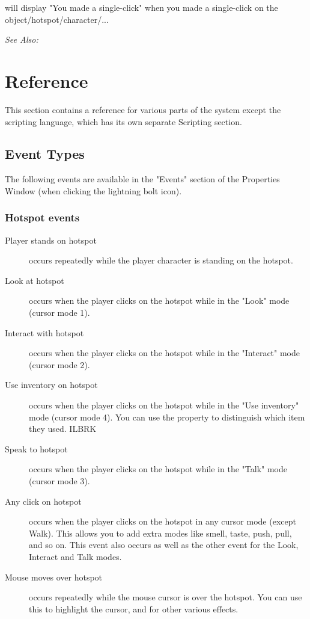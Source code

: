will display "You made a single-click" when you made a single-click on the object/hotspot/character/...

\it{See Also:} 




\chapter{Reference}%

This section contains a reference for various parts of the system except the scripting
language, which has its own separate Scripting section.

\section{Event Types}%

The following events are available in the "Events" section of the Properties Window
(when clicking the lightning bolt icon).

\subsection{Hotspot events}%

\begin{description}
\item [Player stands on hotspot] occurs repeatedly while the player character
is standing on the hotspot.
\item [Look at hotspot] occurs when the player clicks on the hotspot while in
the "Look" mode (cursor mode 1).
\item [Interact with hotspot] occurs when the player clicks on the hotspot while
in the "Interact" mode (cursor mode 2).
\item [Use inventory on hotspot] occurs when the player clicks on the hotspot
while in the "Use inventory" mode (cursor mode 4). You can use the
 property to distinguish
which item they used. ILBRK
\item [Speak to hotspot] occurs when the player clicks on the hotspot while in
the "Talk" mode (cursor mode 3).
\item [Any click on hotspot] occurs when the player clicks on the hotspot in
any cursor mode (except Walk). This allows you to add extra modes like
smell, taste, push, pull, and so on. This event also occurs as well as
the other event for the Look, Interact and Talk modes.
\item [Mouse moves over hotspot] occurs repeatedly while the mouse cursor is
over the hotspot. You can use this to highlight the cursor, and for other
various effects.
\end{description}

